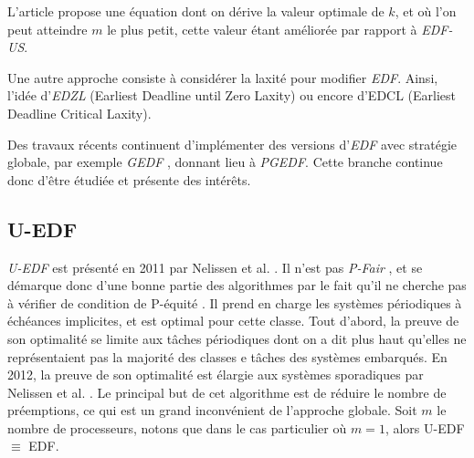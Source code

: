 \documentclass[11pt,a4paper,oneside]{report}
\begin{document}
	L'article propose une équation dont on dérive la valeur optimale de $k$, et où l'on peut 
	atteindre $m$ le plus petit, cette valeur étant améliorée par rapport à \textit{EDF-US}.\medskip
	
	Une autre approche consiste à considérer la laxité pour modifier \textit{EDF}. 
	Ainsi, l'idée d'\textit{EDZL} (Earliest Deadline until Zero Laxity) \cite{cirinei_edzl_2007} ou encore d'EDCL \cite{kato_real-time_2007}
	(Earliest Deadline Critical Laxity). \medskip
	
	Des travaux récents continuent d'implémenter des versions d'\textit{EDF} avec stratégie 
	globale, par exemple \textit{GEDF} \cite{li_global_2015} \cite{nelissen_geoffrey_efficient_2013}, donnant lieu à \textit{PGEDF}. Cette 
	branche continue donc d'être étudiée et présente des intérêts.
	
	\subsection{U-EDF}
	\textit{U-EDF} est présenté en 2011 par Nelissen et al. \cite{nelissen_reducing_2011}. Il n'est pas \og \textit{P-Fair}\fg{} , et se démarque donc d'une bonne partie des algorithmes 
	par le fait qu'il ne cherche pas à vérifier de condition de \og P-équité\fg{} .
	Il prend en charge les systèmes périodiques à échéances implicites, et est optimal pour cette classe. 
	Tout d'abord, la preuve de son optimalité se limite aux tâches périodiques dont on a dit plus haut qu'elles 
	ne représentaient pas la majorité des classes e tâches des systèmes embarqués. 
	En 2012, la preuve de son optimalité est élargie aux systèmes sporadiques par Nelissen et al. \cite{nelissen_u-edf_2012}. Le principal but de cet algorithme est de 
	réduire le nombre de préemptions, ce qui est un grand inconvénient de l'approche globale. 
	Soit $m$ le nombre de processeurs, notons que dans le cas particulier où $m = 1$, alors 
	U-EDF $\equiv$ EDF. 
	
\end{document}
